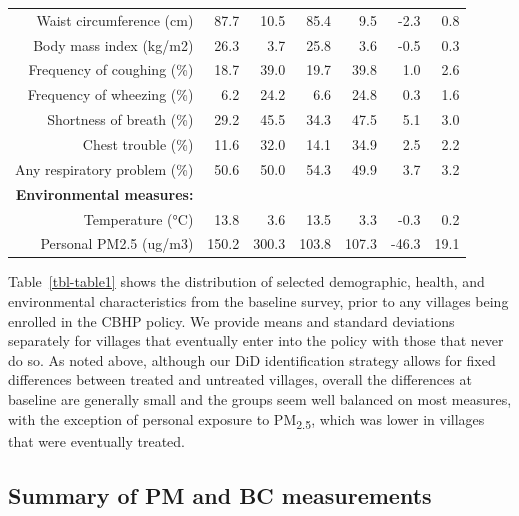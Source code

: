 \documentclass[
  letterpaper,
  DIV=11,
  numbers=noendperiod]{scrartcl}
\makeatletter
\renewenvironment{table}%
  {\renewcommand\familydefault\sfdefault
   \@float{table}}
  {\end@float}
\makeatother
\begin{document}
\begin{table}
\begin{tabular}[t]{rrrrrrr}
Waist circumference (cm) & 87.7 & 10.5 & 85.4 & 9.5 & -2.3 & 0.8\\
Body mass index (kg/m2) & 26.3 & 3.7 & 25.8 & 3.6 & -0.5 & 0.3\\
Frequency of coughing (\%) & 18.7 & 39.0 & 19.7 & 39.8 & 1.0 & 2.6\\
Frequency of wheezing (\%) & 6.2 & 24.2 & 6.6 & 24.8 & 0.3 & 1.6\\
Shortness of breath (\%) & 29.2 & 45.5 & 34.3 & 47.5 & 5.1 & 3.0\\
Chest trouble (\%) & 11.6 & 32.0 & 14.1 & 34.9 & 2.5 & 2.2\\
Any respiratory problem (\%) & 50.6 & 50.0 & 54.3 & 49.9 & 3.7 & 3.2\\
\textbf{Environmental measures:} & \textbf{} & \textbf{} & \textbf{} & \textbf{} & \textbf{} & \textbf{}\\
Temperature (°C) & 13.8 & 3.6 & 13.5 & 3.3 & -0.3 & 0.2\\
Personal PM2.5 (ug/m3) & 150.2 & 300.3 & 103.8 & 107.3 & -46.3 & 19.1\\
\bottomrule
\end{tabular}
\end{table}

Table~\ref{tbl-table1} shows the distribution of selected demographic,
health, and environmental characteristics from the baseline survey,
prior to any villages being enrolled in the CBHP policy. We provide
means and standard deviations separately for villages that eventually
enter into the policy with those that never do so. As noted above,
although our DiD identification strategy allows for fixed differences
between treated and untreated villages, overall the differences at
baseline are generally small and the groups seem well balanced on most
measures, with the exception of personal exposure to
PM\textsubscript{2.5}, which was lower in villages that were eventually
treated.

\hypertarget{summary-of-pm-and-bc-measurements}{%
\subsection{Summary of PM and BC
measurements}\label{summary-of-pm-and-bc-measurements}}
\end{document}
